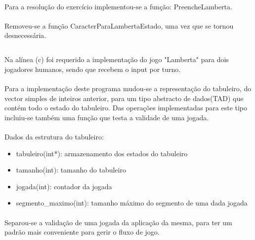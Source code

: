 \paragraph{} Para a resolução do exercício implementou-se a função:
PreencheLamberta.

\paragraph{} Removeu-se a função CaracterParaLambertaEstado, uma vez que se
tornou desnecessária.

\newpage

\subsection{}

\paragraph{} Na alínea (c) foi requerido a implementação do jogo "Lamberta"
para dois jogadores humanos, sendo que recebem o input por turno.

\paragraph{} Para a implementação deste programa mudou-se a representação do
tabuleiro, do vector simples de inteiros anterior, para um tipo abstracto de
dados(TAD) que contém todo o estado do tabuleiro. Das operações implementadas
para este tipo incluiu-se também uma função que testa a validade de uma
jogada.

\paragraph{} Dados da estrutura do tabuleiro:

\begin{itemize}
\item tabuleiro(int*): armazenamento dos estados do tabuleiro
\item tamanho(int): tamanho do tabuleiro
\item jogada(int): contador da jogada
\item segmento\_maximo(int): tamanho máximo do segmento de uma dada jogada
\end{itemize}

\paragraph{} Separou-se a validação de uma jogada da aplicação da mesma, para
ter um padrão mais conveniente para gerir o fluxo de jogo.

